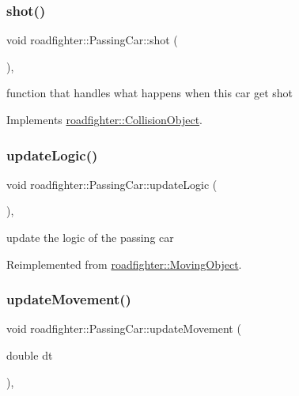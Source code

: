\subsubsection{\texorpdfstring{shot()}{shot()}}
{\footnotesize\ttfamily void roadfighter\+::\+Passing\+Car\+::shot (\begin{DoxyParamCaption}{ }\end{DoxyParamCaption})\hspace{0.3cm}{\ttfamily [override]}, {\ttfamily [virtual]}}

function that handles what happens when this car get shot 

Implements \hyperlink{classroadfighter_1_1CollisionObject_a338a1071e6d5e25439e57c8673308dbb}{roadfighter\+::\+Collision\+Object}.

\mbox{\label{classroadfighter_1_1PassingCar_ac3fe3087290121bf44880f94efa3a916}} 
\subsubsection{\texorpdfstring{update\+Logic()}{updateLogic()}}
{\footnotesize\ttfamily void roadfighter\+::\+Passing\+Car\+::update\+Logic (\begin{DoxyParamCaption}{ }\end{DoxyParamCaption})\hspace{0.3cm}{\ttfamily [override]}, {\ttfamily [virtual]}}

update the logic of the passing car 

Reimplemented from \hyperlink{classroadfighter_1_1MovingObject_a2c5d69054a59fc5c6d7458f864ee9d57}{roadfighter\+::\+Moving\+Object}.

\mbox{\label{classroadfighter_1_1PassingCar_ade5ebca5d7dbdb75bd9eee5817972363}} 
\subsubsection{\texorpdfstring{update\+Movement()}{updateMovement()}}
{\footnotesize\ttfamily void roadfighter\+::\+Passing\+Car\+::update\+Movement (\begin{DoxyParamCaption}\item[{double}]{dt }\end{DoxyParamCaption})\hspace{0.3cm}{\ttfamily [override]}, {\ttfamily [virtual]}}

